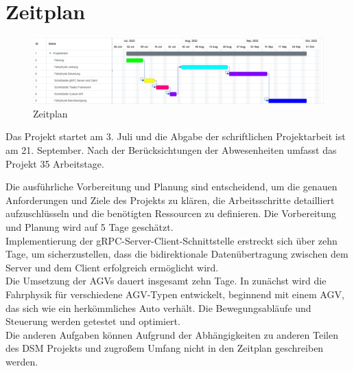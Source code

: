 \section{Zeitplan}

\begin{figure}[h]
    \centering
    \includegraphics[width=18cm, page=1]{images/Zeitplan (3).pdf}
    \caption{Zeitplan}
    \label{Zeitplan}
\end{figure}
Das Projekt startet am 3. Juli und die Abgabe der schriftlichen Projektarbeit ist am 21. September. Nach der Berücksichtungen der Abwesenheiten umfasst das Projekt 35 Arbeitstage.

Die ausführliche Vorbereitung und Planung sind entscheidend, um die genauen Anforderungen und Ziele des Projekts zu klären, die Arbeitsschritte detailliert aufzuschlüsseln und die benötigten Ressourcen zu definieren. Die Vorbereitung und Planung wird auf 5 Tage geschätzt.\\
Implementierung der gRPC-Server-Client-Schnittstelle erstreckt sich über zehn Tage, um sicherzustellen, dass die bidirektionale Datenübertragung zwischen dem Server und dem Client erfolgreich ermöglicht wird.\\

Die Umsetzung der AGVs dauert insgesamt zehn Tage. In zunächst wird die Fahrphysik für verschiedene AGV-Typen entwickelt, beginnend mit einem AGV, das sich wie ein herkömmliches Auto verhält. Die Bewegungsabläufe und Steuerung werden getestet und optimiert.\\

Die anderen Aufgaben können Aufgrund der Abhängigkeiten zu anderen Teilen des DSM Projekts und zugroßem Umfang nicht in den Zeitplan geschreiben werden.

